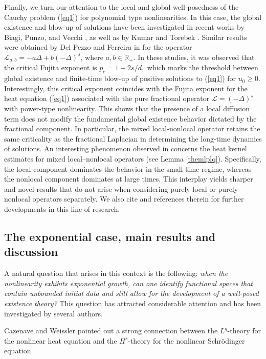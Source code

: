 \documentclass[a4paper,11pt]{amsart}
\renewcommand\eqref[1]{(\ref{#1})} %
\numberwithin{equation}{section}
\theoremstyle{plain}
\theoremstyle{definition}
\begin{document}
Finally, we turn our attention to the local and global well-posedness of the Cauchy problem \eqref{eq1} for polynomial type nonlinearities.   In this case, the global existence and blow-up of solutions have been investigated in recent works by Biagi, Punzo, and Vecchi \cite{Biagi}, as well as by Kumar and Torebek \cite{KT2026}. Similar results were obtained by Del Pezzo and Ferreira in \cite{Pezzo} for the operator $\mathcal L_{a,b} = -a\Delta + b(-\Delta)^s$, where $a,b \in \mathbb{R}_+$. 
In these studies, it was observed that the critical Fujita exponent is $p_c= 1 + 2s/d,$
which marks the threshold between global existence and finite-time blow-up of positive solutions to \eqref{eq1} for $u_0 \ge 0$. Interestingly, this critical exponent coincides with the Fujita exponent for the heat equation \eqref{eq1} associated with the pure fractional operator $\mathcal L = (-\Delta)^s$ with power-type nonlinearity. This shows that the presence of a local diffusion term does not modify the fundamental global existence behavior dictated by the fractional component. In particular, the mixed local-nonlocal operator retains the same criticality as the fractional Laplacian in determining the long-time dynamics of solutions.   An interesting phenomenon observed in \cite{KFA25} concerns the heat kernel estimates for mixed local–nonlocal operators (see Lemma \ref{themlplq}). Specifically, the local component dominates the behavior in the small-time regime, whereas the nonlocal component dominates at large times. This interplay yields sharper and novel results that do not arise when considering purely local or purely nonlocal operators separately.  We also cite \cite{BM25,Castillo3,KFA25,KT2025} and references therein for further developments in this line of research.

\subsection{The exponential case, main results and discussion} A natural question that arises in this context is the following: {\it when the nonlinearity exhibits exponential growth, can one identify functional spaces that contain unbounded initial data and still allow for the development of a well-posed existence theory?} This question has attracted considerable attention and has been investigated by several authors.

Cazenave and Weissler \cite{CW} pointed out a strong connection between the $L^q$-theory for the nonlinear heat equation and the $H^s$-theory for the nonlinear Schr\"odinger equation
\end{document}
